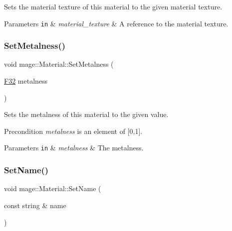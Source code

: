 Sets the material texture of this material to the given material texture.


\begin{DoxyParams}[1]{Parameters}
\mbox{\tt in}  & {\em material\+\_\+texture} & A reference to the material texture. \\
\hline
\end{DoxyParams}
\hypertarget{structmage_1_1_material_a70dde310b2108e9ad3041df13db0bdc0}{}\label{structmage_1_1_material_a70dde310b2108e9ad3041df13db0bdc0} 
\subsubsection{\texorpdfstring{Set\+Metalness()}{SetMetalness()}}
{\footnotesize\ttfamily void mage\+::\+Material\+::\+Set\+Metalness (\begin{DoxyParamCaption}\item[{\hyperlink{namespacemage_aa97e833b45f06d60a0a9c4fc22ae02c0}{F32}}]{metalness }\end{DoxyParamCaption})\hspace{0.3cm}{\ttfamily [noexcept]}}

Sets the metalness of this material to the given value.

\begin{DoxyPrecond}{Precondition}
{\itshape metalness} is an element of \mbox{[}0,1\mbox{]}. 
\end{DoxyPrecond}

\begin{DoxyParams}[1]{Parameters}
\mbox{\tt in}  & {\em metalness} & The metalness. \\
\hline
\end{DoxyParams}
\hypertarget{structmage_1_1_material_a4795f7aa36a445c09af6268a4af8cb61}{}\label{structmage_1_1_material_a4795f7aa36a445c09af6268a4af8cb61} 
\subsubsection{\texorpdfstring{Set\+Name()}{SetName()}\hspace{0.1cm}{\footnotesize\ttfamily [1/2]}}
{\footnotesize\ttfamily void mage\+::\+Material\+::\+Set\+Name (\begin{DoxyParamCaption}\item[{const string \&}]{name }\end{DoxyParamCaption})}

